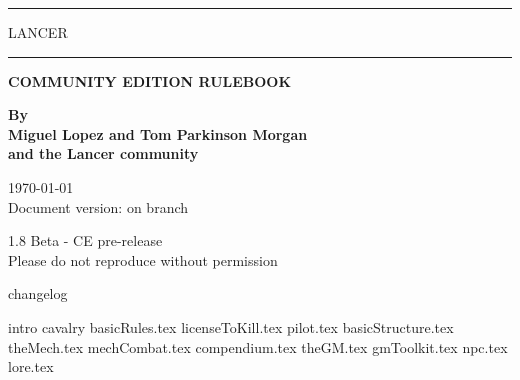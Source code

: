 \documentclass[11pt, letterpaper, openany]{memoir}
\makeatletter
\renewcommand\mainmatter{%
     \clearpage
   \@mainmattertrue
   \pagenumbering{arabic}}
\makeatother
\begin{document}
\begin{center}
\rule[1cm]{0.78\textwidth}{3mm}
{\fontsize{96}{115}\selectfont LANCER}
\rule[-1cm]{0.78\textwidth}{3mm}

\vspace{2cm}
\huge\textbf{COMMUNITY EDITION RULEBOOK}

\vspace{4cm}
\normalsize\textbf{By} \\
\textbf{Miguel Lopez and Tom Parkinson Morgan}\\
\textbf{and the Lancer community}\\

\vspace{2cm}
\date{} %
\today \\
Document version: \texttt{\commit}on branch \texttt{\branch}

\vspace{1cm}
1.8 Beta - CE pre-release\\
Please do not reproduce without permission
\clearpage
\end{center}

{changelog}
\clearpage

\tableofcontents
\endgroup %
\mainmatter
\pagestyle{plain}
\addtocounter{page}{2}

{intro} 
{cavalry}
{basicRules.tex}
{licenseToKill.tex}
{pilot.tex}
{basicStructure.tex}
{theMech.tex}
{mechCombat.tex}
{compendium.tex}
{theGM.tex}
{gmToolkit.tex}
{npc.tex}
{lore.tex}
\end{document}
